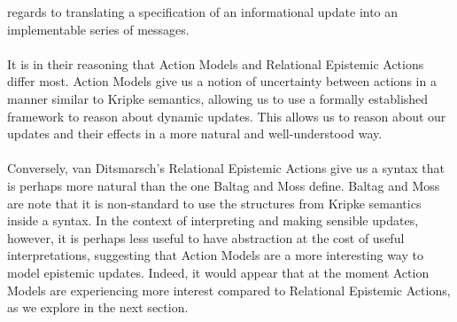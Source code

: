 \documentclass[12pt, a4paper, twoside]{article}
\begin{document}
regards to translating a specification of an informational update into an
implementable series of messages.\\
\\
It is in their reasoning that Action Models and Relational Epistemic Actions
differ most.
Action Models give us a notion of uncertainty between actions in a manner
similar to Kripke semantics, allowing us to use a formally established framework
to reason about dynamic updates.
This allows us to reason about our updates and their effects in a more natural
and well-understood way.\\
\\
Conversely, van Ditsmarsch's Relational Epistemic Actions give us a syntax that
is perhaps more natural than the one Baltag and Moss define.
Baltag and Moss are note that it is non-standard to use the structures from
Kripke semantics inside a syntax.
In the context of interpreting and making sensible updates, however, it is
perhaps less useful to have abstraction at the cost of useful interpretations,
suggesting that Action Models are a more interesting way to model epistemic
updates.
Indeed, it would appear that at the moment Action Models are experiencing more
interest compared to Relational Epistemic Actions, as we explore in the next
section.
\end{document}
